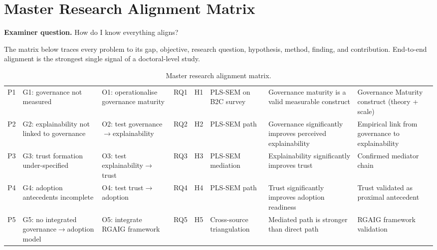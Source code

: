 \section{Master Research Alignment Matrix}
\label{app:distinction_alignment}

\noindent\textbf{Examiner question.} How do I know everything aligns?

\noindent The matrix below traces every problem to its gap, objective, research question, hypothesis, method, finding, and contribution. End-to-end alignment is the strongest single signal of a doctoral-level study.

{\tablestripes\tablefontsize
{}
\begin{xltabular}{\textwidth}{@{} p{1.0cm} p{1.7cm} p{2.0cm} p{1.4cm} p{1.0cm} p{1.7cm} L p{2.4cm} @{}}
\caption[Master research alignment matrix]{Master research alignment matrix.}\label{tab:dist_alignment} \\
\toprule
{} &  &  &  &  &  &  &  \\
\midrule
\endfirsthead
\endhead
\bottomrule
\endlastfoot
P1 & G1: governance not measured & O1: operationalise governance maturity & RQ1 & H1 & PLS-SEM on B2C survey & Governance maturity is a valid measurable construct & Governance Maturity construct (theory + scale) \\
\addlinespace
P2 & G2: explainability not linked to governance & O2: test governance$\rightarrow$explainability & RQ2 & H2 & PLS-SEM path & Governance significantly improves perceived explainability & Empirical link from governance to explainability \\
\addlinespace
P3 & G3: trust formation under-specified & O3: test explainability$\rightarrow$trust & RQ3 & H3 & PLS-SEM mediation & Explainability significantly improves trust & Confirmed mediator chain \\
\addlinespace
P4 & G4: adoption antecedents incomplete & O4: test trust$\rightarrow$adoption & RQ4 & H4 & PLS-SEM path & Trust significantly improves adoption readiness & Trust validated as proximal antecedent \\
\addlinespace
P5 & G5: no integrated governance$\rightarrow$adoption model & O5: integrate RGAIG framework & RQ5 & H5 & Cross-source triangulation & Mediated path is stronger than direct path & RGAIG framework validation \\
\end{xltabular}}

